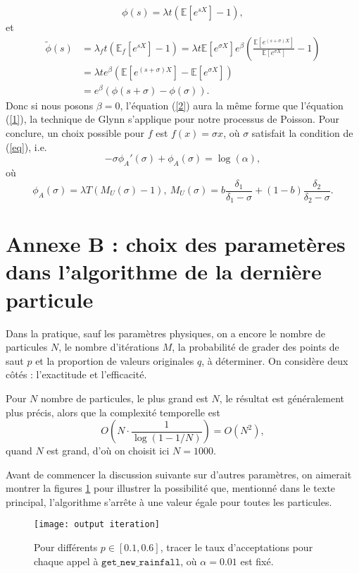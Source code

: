 \documentclass{article}
\def \E {\mathbb{E}}
\begin{document}
\[\phi(s)=\lambda t(\E[e^{sX}]-1),\]
et
\begin{equation}
\label{2}
    \begin{split}
    \tilde{\phi}(s)&=\lambda_ft(\E_f[e^{sX}]-1)=\lambda t\E[e^{\sigma X}]e^{\beta}\left(\frac{\E[e^{(s+\sigma)X}]}{\E[e^{\sigma X}]}-1\right)\\
    &=\lambda te^{\beta}(\E[e^{(s+\sigma)X}]-\E[e^{\sigma X}])\\
    &=e^{\beta}(\phi(s+\sigma)-\phi(\sigma)).
\end{split}
\end{equation}
Donc si nous posons $\beta=0$, l'équation (\ref{2}) aura la même forme que l'équation (\ref{1}), la technique de Glynn s'applique pour notre processus de Poisson. Pour conclure, un choix possible pour $f$ est $f(x)=\sigma x$, où $\sigma$ satisfait la condition de (\ref{eq}), i.e.
\[-\sigma \phi_A'(\sigma)+\phi_A(\sigma)=\log(\alpha),\]
où
\[\phi_A(\sigma)=\lambda T(M_U(\sigma)-1),\ M_U(\sigma)=b\frac{\delta_1}{\delta_1-\sigma}+(1-b)\frac{\delta_2}{\delta_2-\sigma}.\]
\section*{Annexe B : choix des parametères dans l'algorithme de la dernière particule}
Dans la pratique, sauf les paramètres physiques, on a encore le nombre de particules $N$, le nombre d'itérations $M$, la probabilité de grader des points de saut $p$ et la proportion de valeurs originales $q$, à déterminer. On considère deux côtés : l'exactitude et l'efficacité.

Pour $N$ nombre de particules, le plus grand est $N$, le résultat est généralement plus précis, alors que la complexité temporelle est 
\[O(N\cdot\frac{1}{\log(1-1/N)})=O(N^2),\]
quand $N$ est grand, d'où on choisit ici $N=1000$.

Avant de commencer la discussion suivante sur d'autres paramètres, on aimerait montrer la figures \ref{0.5} pour illustrer la possibilité que, mentionné dans le texte principal, l'algorithme s'arrête à une valeur égale pour toutes les particules. 

\begin{figure}[H]
    \centering
    \texttt{[image: output iteration]}
    \caption{Pour différents $p\in[0.1,0.6]$, tracer le taux d'acceptations pour chaque appel à $\texttt{get\_new\_rainfall}$, où $\alpha=0.01$ est fixé.}
    \label{0.5}
\end{figure}
\end{document}

